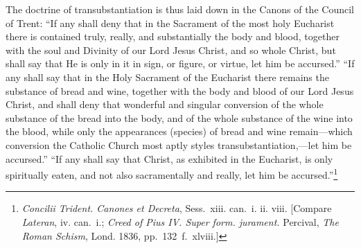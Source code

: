 \documentclass[
]{book}
\begin{document}
The doctrine of transubstantiation is thus laid down in the Canons of the Council of Trent: ``If any shall deny that in the Sacrament of the most holy Eucharist there is contained truly, really, and substantially the body and blood, together with the soul and Divinity of our Lord Jesus Christ, and so whole Christ, but shall say that He is only in it in sign, or figure, or virtue, let him be accursed.'' ``If any shall say that in the Holy Sacrament of the Eucharist there remains the substance of bread and wine, together with the body and blood of our Lord Jesus Christ, and shall deny that wonderful and singular conversion of the whole substance of the bread into the body, and of the whole substance of the wine into the blood, while only the appearances (species) of bread and wine remain---which conversion the Catholic Church most aptly styles transubstantiation,---let him be accursed.'' ``If any shall say that Christ, as exhibited in the Eucharist, is only spiritually eaten, and not also sacramentally and really, let him be accursed.''\footnote{\foreignlanguage{latin}{\emph{Concilii Trident. Canones et Decreta}}, Sess.~xiii. can.~i. ii. viii. {[}Compare \emph{Lateran}, iv. can.~i.; \emph{Creed of Pius IV. Super form. jurament.} Percival, \emph{The Roman Schism}, Lond. 1836, pp.~132~f.~xlviii.{]}}
\end{document}
